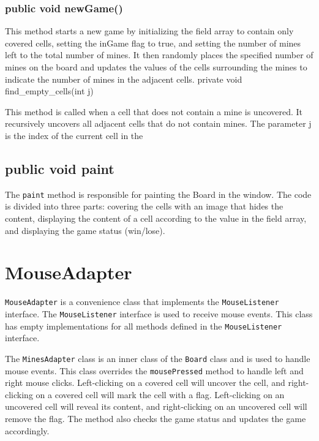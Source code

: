 \documentclass[
]{article}
\begin{document}
\hypertarget{public-void-newgame}{%
\subsubsection{public void newGame()}\label{public-void-newgame}}

This method starts a new game by initializing the field array to contain
only covered cells, setting the inGame flag to true, and setting the
number of mines left to the total number of mines. It then randomly
places the specified number of mines on the board and updates the values
of the cells surrounding the mines to indicate the number of mines in
the adjacent cells. private void find\_empty\_cells(int j)

This method is called when a cell that does not contain a mine is
uncovered. It recursively uncovers all adjacent cells that do not
contain mines. The parameter j is the index of the current cell in the

\hypertarget{public-void-paint}{%
\subsection{public void paint}\label{public-void-paint}}

The \texttt{paint} method is responsible for painting the Board in the
window. The code is divided into three parts: covering the cells with an
image that hides the content, displaying the content of a cell according
to the value in the field array, and displaying the game status
(win/lose).

\hypertarget{mouseadapter}{%
\section{MouseAdapter}\label{mouseadapter}}

\texttt{MouseAdapter} is a convenience class that implements the
\texttt{MouseListener} interface. The \texttt{MouseListener} interface
is used to receive mouse events. This class has empty implementations
for all methods defined in the \texttt{MouseListener} interface.

The \texttt{MinesAdapter} class is an inner class of the \texttt{Board}
class and is used to handle mouse events. This class overrides the
\texttt{mousePressed} method to handle left and right mouse clicks.
Left-clicking on a covered cell will uncover the cell, and
right-clicking on a covered cell will mark the cell with a flag.
Left-clicking on an uncovered cell will reveal its content, and
right-clicking on an uncovered cell will remove the flag. The method
also checks the game status and updates the game accordingly.
\end{document}
